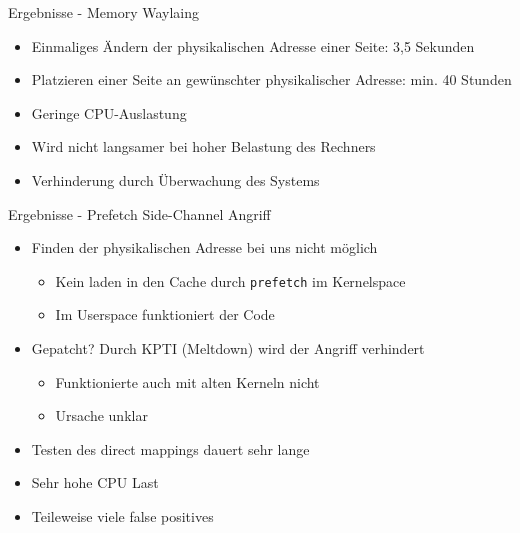 \documentclass[german,10pt,xcolor=colortbl,compress
]{beamer}
\begin{document}
\begin{frame}{Ergebnisse - Memory Waylaing}
\begin{itemize}
\item Einmaliges Ändern der physikalischen Adresse einer Seite: 3,5 Sekunden
\item Platzieren einer Seite an gewünschter physikalischer Adresse: min. 40 Stunden
\item Geringe CPU-Auslastung
\item Wird nicht langsamer bei hoher Belastung des Rechners
\item Verhinderung durch Überwachung des Systems
\end{itemize}

\end{frame}
\begin{frame}{Ergebnisse - Prefetch Side-Channel Angriff}
\begin{itemize}
	\item Finden der physikalischen Adresse bei uns nicht möglich
	\begin{itemize}
		\item Kein laden in den Cache durch \texttt{prefetch} im Kernelspace
		\item Im Userspace funktioniert der Code
	\end{itemize}
	\item Gepatcht? Durch KPTI (Meltdown) wird der Angriff verhindert
	\begin{itemize}
		\item Funktionierte auch mit alten Kerneln nicht
		\item Ursache unklar
	\end{itemize}
	\item Testen des direct mappings dauert sehr lange
	\item Sehr hohe CPU Last
	\item Teileweise viele false positives
\end{itemize}
\end{frame}
\end{document}
